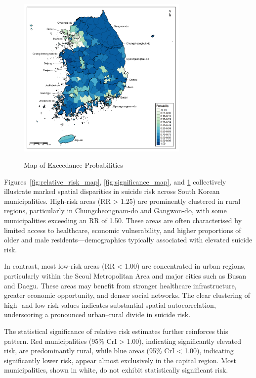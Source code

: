 \documentclass[11pt]{article}
\begin{document}
	\vspace{-2em}
	
	\begin{figure}[H]
		\centering
		\caption{Map of Exceedance Probabilities}
		\includegraphics[width=0.74\textwidth]{assets/exceedance_probabilities/exceedance_probabilities_map_2022_annotated.png}
		\label{fig:exceedance_probabilities_map}
	\end{figure}
	
	Figures~\ref{fig:relative_risk_map}, \ref{fig:significance_map}, and \ref{fig:exceedance_probabilities_map} collectively illustrate marked spatial disparities in suicide risk across South Korean municipalities. High-risk areas (RR > 1.25) are prominently clustered in rural regions, particularly in Chungcheongnam-do and Gangwon-do, with some municipalities exceeding an RR of 1.50. These areas are often characterised by limited access to healthcare, economic vulnerability, and higher proportions of older and male residents—demographics typically associated with elevated suicide risk.
	
	In contrast, most low-risk areas (RR < 1.00) are concentrated in urban regions, particularly within the Seoul Metropolitan Area and major cities such as Busan and Daegu. These areas may benefit from stronger healthcare infrastructure, greater economic opportunity, and denser social networks. The clear clustering of high- and low-risk values indicates substantial spatial autocorrelation, underscoring a pronounced urban–rural divide in suicide risk.

	The statistical significance of relative risk estimates further reinforces this pattern. Red municipalities (95\% CrI > 1.00), indicating significantly elevated risk, are predominantly rural, while blue areas (95\% CrI < 1.00), indicating significantly lower risk, appear almost exclusively in the capital region. Most municipalities, shown in white, do not exhibit statistically significant risk.
\end{document}
